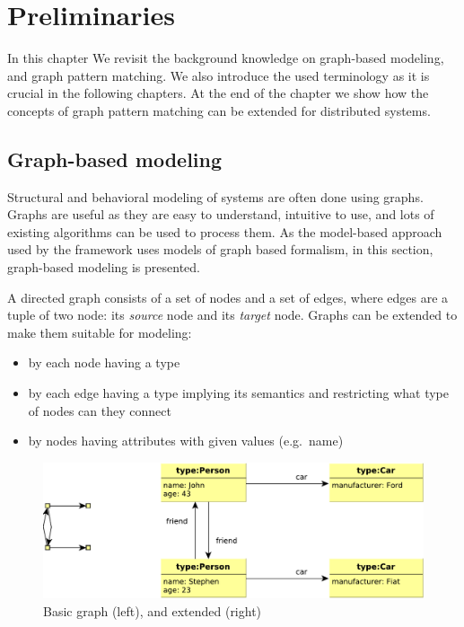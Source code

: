 
\chapter{Preliminaries}

In this chapter We revisit the background knowledge on graph-based modeling, and graph pattern matching. We also introduce the used terminology as it is crucial in the following chapters. At the end of the chapter we show how the concepts of graph pattern matching can be extended for distributed systems.

\section{Graph-based modeling}

Structural and behavioral modeling of systems are often done using graphs. 
Graphs are useful as they are easy to understand, intuitive to use, and lots of existing algorithms can be used to process them. 
As the model-based approach used by the framework uses models of graph based formalism, in this section, graph-based modeling is presented.

A directed graph consists of a set of nodes and a set of edges, where edges are a tuple of two node: its \emph{source} node and its \emph{target} node. 
Graphs can be extended to make them suitable for modeling:

\begin{itemize}
	\item by each node having a type
	\item by each edge having a type implying its semantics and restricting what type of nodes can they connect
	\item by nodes having attributes with given values (e.g.\ name)
\end{itemize}


\begin{figure}[H]
	\begin{center}
		\includegraphics[width=\textwidth]{figures/graphs.pdf}
		\caption{Basic graph (left), and extended (right) }
		\label{fig:graphs}
	\end{center}
\end{figure}

